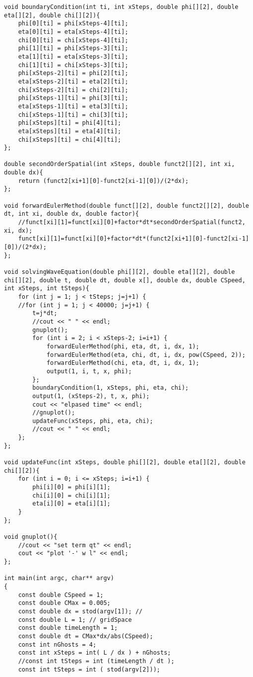 \documentclass[10pt,fleqn,reqno,a4paper]{article}
\begin{document}
\begin{verbatim}
void boundaryCondition(int ti, int xSteps, double phi[][2], double eta[][2], double chi[][2]){
    phi[0][ti] = phi[xSteps-4][ti];
    eta[0][ti] = eta[xSteps-4][ti];
    chi[0][ti] = chi[xSteps-4][ti];
    phi[1][ti] = phi[xSteps-3][ti];
    eta[1][ti] = eta[xSteps-3][ti];
    chi[1][ti] = chi[xSteps-3][ti];
    phi[xSteps-2][ti] = phi[2][ti];
    eta[xSteps-2][ti] = eta[2][ti];
    chi[xSteps-2][ti] = chi[2][ti];
    phi[xSteps-1][ti] = phi[3][ti];
    eta[xSteps-1][ti] = eta[3][ti];
    chi[xSteps-1][ti] = chi[3][ti];
    phi[xSteps][ti] = phi[4][ti];
    eta[xSteps][ti] = eta[4][ti];
    chi[xSteps][ti] = chi[4][ti];
};

double secondOrderSpatial(int xSteps, double funct2[][2], int xi, double dx){
    return (funct2[xi+1][0]-funct2[xi-1][0])/(2*dx);
};

void forwardEulerMethod(double funct[][2], double funct2[][2], double dt, int xi, double dx, double factor){
    //funct[xi][1]=funct[xi][0]+factor*dt*secondOrderSpatial(funct2, xi, dx);
    funct[xi][1]=funct[xi][0]+factor*dt*(funct2[xi+1][0]-funct2[xi-1][0])/(2*dx);
};

void solvingWaveEquation(double phi[][2], double eta[][2], double chi[][2], double t, double dt, double x[], double dx, double CSpeed, int xSteps, int tSteps){
    for (int j = 1; j < tSteps; j=j+1) {
    //for (int j = 1; j < 40000; j=j+1) {
        t=j*dt;
        //cout << " " << endl;
        gnuplot();
        for (int i = 2; i < xSteps-2; i=i+1) {
            forwardEulerMethod(phi, eta, dt, i, dx, 1);
            forwardEulerMethod(eta, chi, dt, i, dx, pow(CSpeed, 2));
            forwardEulerMethod(chi, eta, dt, i, dx, 1);
            output(1, i, t, x, phi);
        };
        boundaryCondition(1, xSteps, phi, eta, chi);
        output(1, (xSteps-2), t, x, phi);
        cout << "elpased time" << endl;
        //gnuplot();
        updateFunc(xSteps, phi, eta, chi);
        //cout << " " << endl;
    };
};

void updateFunc(int xSteps, double phi[][2], double eta[][2], double chi[][2]){
    for (int i = 0; i <= xSteps; i=i+1) {
        phi[i][0] = phi[i][1];
        chi[i][0] = chi[i][1];
        eta[i][0] = eta[i][1];
	}
};

void gnuplot(){
    //cout << "set term qt" << endl;
    cout << "plot '-' w l" << endl;
};

int main(int argc, char** argv)
{
    const double CSpeed = 1;
    const double CMax = 0.005;
    const double dx = stod(argv[1]); //
    const double L = 1; // gridSpace
    const double timeLength = 1;
    const double dt = CMax*dx/abs(CSpeed);
    const int nGhosts = 4;
    const int xSteps = int( L / dx ) + nGhosts;
    //const int tSteps = int (timeLength / dt );
    const int tSteps = int ( stod(argv[2]));


\end{verbatim}
\end{document}
